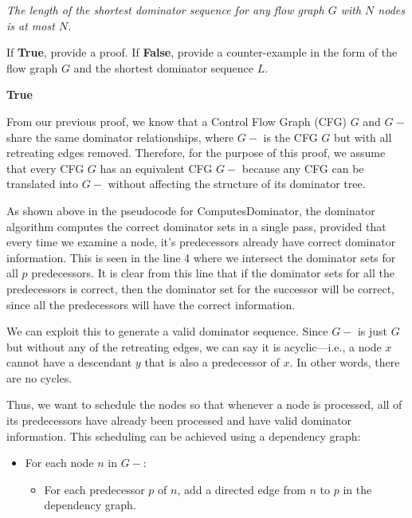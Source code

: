 \documentclass[12pt]{article}
\begin{document}
\begin{enumerate}
\begin{enumerate}
          \emph{The length of the shortest dominator sequence for any flow graph
          $G$ with $N$ nodes is at most $N$.}

        If \textbf{True}, provide a proof. If \textbf{False}, provide a
        counter-example in the form of the flow graph $G$ and the shortest
        dominator sequence $L$.
        \begin{mdframed}
        \textbf{True}

From our previous proof, we know that a Control Flow Graph (CFG) $G$ and $G-$ share the same dominator relationships, where $G-$ is the CFG $G$ but with all retreating edges removed. Therefore, for the purpose of this proof, we assume that every CFG $G$ has an equivalent CFG $G-$ because any CFG can be translated into $G-$ without affecting the structure of its dominator tree.

   As shown above in the pseudocode for ComputesDominator, the dominator algorithm computes the correct dominator sets in a single pass, provided that every time we examine a node, it's predecessors already have correct dominator information. This is seen in the line 4 where we intersect the dominator sets for all $p$ predecessors. It is clear from this line that if the dominator sets for all the predecessors is correct, then the dominator set for the successor will be correct, since all the predecessors will have the correct information.

    We can exploit this to generate a valid dominator sequence. Since $G-$ is just $G$ but without any of the retreating edges, we can say it is acyclic—i.e., a node \( x \) cannot have a descendant \( y \) that is also a predecessor of \( x \). In other words, there are no cycles.

    Thus, we want to schedule the nodes so that whenever a node is processed, all of its predecessors have already been processed and have valid dominator information. This scheduling can be achieved using a dependency graph:

    \begin{itemize}
      \item For each node \( n \) in $G-$:
      \begin{itemize}
        \item For each predecessor \( p \) of \( n \), add a directed edge from \( n \) to \( p \) in the dependency graph.
      \end{itemize}
    \end{itemize}


\end{mdframed}
\end{enumerate}
\end{enumerate}
\end{document}
